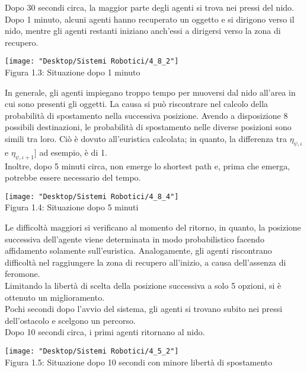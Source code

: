 \documentclass[12pt,a4paper,openright,twoside]{report}
\begin{document}
Dopo 30 secondi circa, la maggior parte degli agenti si trova nei pressi del nido. Dopo 1 minuto, alcuni agenti hanno recuperato un oggetto e si dirigono verso il nido, mentre gli agenti restanti iniziano anch'essi a dirigersi verso la zona di recupero.

\begin{center}  
	\texttt{[image: "Desktop/Sistemi Robotici/4\_8\_2"]}
	\\Figura 1.3: Situazione dopo 1 minuto
\end{center}

In generale, gli agenti impiegano troppo tempo per muoversi dal nido all'area in cui sono presenti gli oggetti. La causa si può riscontrare nel calcolo della probabilità di spostamento nella successiva posizione. Avendo a disposizione 8 possibili destinazioni, le probabilità di spostamento nelle diverse posizioni sono simili tra loro. Ciò è dovuto all'euristica calcolata; in quanto, la differenza tra $\eta_{\psi,\iota}$ e $\eta_{\psi,\iota+1}]$ ad esempio, è di 1.\\
Inoltre, dopo 5 minuti circa, non emerge lo shortest path e, prima che emerga, potrebbe essere necessario del tempo.

\begin{center}  
	\texttt{[image: "Desktop/Sistemi Robotici/4\_8\_4"]}
	\\Figura 1.4: Situazione dopo 5 minuti
\end{center}

Le difficoltà maggiori si verificano al momento del ritorno, in quanto, la posizione successiva dell'agente viene determinata in modo probabilistico facendo affidamento solamente sull'euristica. Analogamente, gli agenti riscontrano difficoltà nel raggiungere la zona di recupero all'inizio, a causa dell'assenza di feromone.\\
Limitando la libertà di scelta della posizione successiva a solo 5 opzioni, si è ottenuto un miglioramento.\\
Pochi secondi dopo l'avvio del sistema, gli agenti si trovano subito nei pressi dell'ostacolo e scelgono un percorso.\\
Dopo 10 secondi circa, i primi agenti ritornano al nido.\\

\begin{center}  
	\texttt{[image: "Desktop/Sistemi Robotici/4\_5\_2"]}
	\\Figura 1.5: Situazione dopo 10 secondi con minore libertà di spostamento
\end{center}
\end{document}
